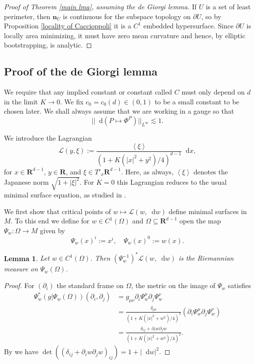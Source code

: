 \documentclass[reqno,10pt]{amsart}
\newcommand{\RR}{\mathbf{R}}
\newcommand*\dif{\mathop{}\!\mathrm{d}}
\newcommand{\Lagrange}{\mathscr L}
\newcommand{\normal}{\mathbf n}
\def\Japan#1{\left \langle #1 \right \rangle}
\newtheorem{lemma}[theorem]{Lemma}
\theoremstyle{definition}
\numberwithin{equation}{section}
\begin{document}
\begin{proof}[Proof of Theorem \ref{main lma}, assuming the de Giorgi lemma]
If $U$ is a set of least perimeter, then $\normal_U$ is continuous for the subspace topology on $\partial U$, so by Proposition \ref{locality of Caccioppoli} it is a $C^1$ embedded hypersurface.
Since $\partial U$ is locally area minimizing, it must have zero mean curvature and hence, by elliptic bootstrapping, is analytic.
\end{proof}


\subsection{Proof of the de Giorgi lemma}
We require that any implied constant or constant called $C$ must only depend on $d$ in the limit $K \to 0$.
We fix $c_0 = c_0(d) \in (0, 1)$ to be a small constant to be chosen later.
We shall always assume that we are working in a gauge so that 
\begin{equation}\label{oscillation of isometries}
||\dif(P \mapsto \Phi^P)||_{L^\infty} \lesssim 1.
\end{equation}

We introduce the Lagrangian
$$\Lagrange(y, \xi) := \frac{\Japan{\xi}}{(1 + K(|x|^2 + y^2)/4)^{d - 1}} \dif x,$$
for $x \in \RR^{d - 1}$, $y \in \RR$, and $\xi \in T'_x \RR^{d - 1}$.
Here, as always, $\Japan \xi$ denotes the Japanese norm $\sqrt{1 + |\xi|^2}$.
For $K = 0$ this Lagrangian reduces to the usual minimal surface equation, as studied in \cite[\S6]{Giusti77}.

We first show that critical points of $w \mapsto \Lagrange(w, \dif w)$ define minimal surfaces in $M$.
To this end we define for $w \in C^1(\Omega)$ and $\Omega \subseteq \RR^{d - 1}$ open the map $\Psi_w: \Omega \to M$ given by 
$$\Psi_w(x)^i := x^i, \quad \Psi_w(x)^0 := w(x).$$

\begin{lemma}\label{Plateau setup lemma}
Let $w \in C^1(\Omega)$. Then $(\Psi_w^{-1})^* \Lagrange(w, \dif w)$ is the Riemannian measure on $\Psi_w(\Omega)$.
\end{lemma}
\begin{proof}
For $(\partial_i)$ the standard frame on $\Omega$, the metric on the image of $\Psi_w$ satisfies
\begin{align*}
\Psi_w^*(g|\Psi_w(\Omega))(\partial_i, \partial_j) &= g_{\mu\nu} \partial_i \Psi_w^\mu \partial_j \Psi_w^\nu \\
&= \frac{\delta_{\mu\nu}}{(1 + K(|x|^2 + w^2)/4)^2} (\partial_i \Psi_w^\mu \partial_j \Psi_w^\nu) \\
&= \frac{\delta_{ij} + \partial_i w \partial_j w}{(1 + K(|x|^2 + w^2)/4)^2}.
\end{align*}
By \cite[(24)]{Petersen2008} we have $\det((\delta_{ij} + \partial_i w \partial_j w)_{ij}) = 1 + |\dif w|^2$.
\end{proof}
\end{document}
